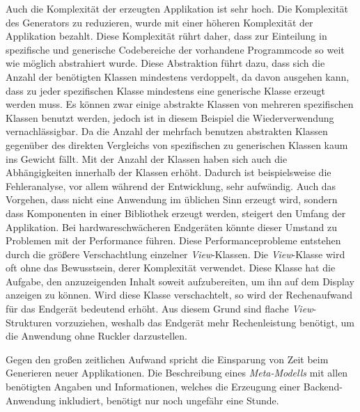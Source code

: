 Auch die Komplexität der erzeugten Applikation ist sehr hoch. Die Komplexität des Generators zu reduzieren, wurde mit einer höheren Komplexität der Applikation bezahlt. Diese Komplexität rührt daher, dass zur Einteilung in spezifische und generische Codebereiche der vorhandene Programmcode so weit wie möglich abstrahiert wurde. Diese Abstraktion führt dazu, dass sich die Anzahl der benötigten Klassen mindestens verdoppelt, da davon ausgehen kann, dass zu jeder spezifischen Klasse mindestens eine generische Klasse erzeugt werden muss. Es können zwar einige abstrakte Klassen von mehreren spezifischen Klassen benutzt werden, jedoch ist in diesem Beispiel die Wiederverwendung vernachlässigbar. Da die Anzahl der mehrfach benutzen abstrakten Klassen gegenüber des direkten Vergleichs von spezifischen zu generischen Klassen kaum ins Gewicht fällt. Mit der Anzahl der Klassen haben sich auch die Abhängigkeiten innerhalb der Klassen erhöht. Dadurch ist beispielsweise die Fehleranalyse, vor allem während der Entwicklung, sehr aufwändig. Auch das Vorgehen, dass nicht eine Anwendung im üblichen Sinn erzeugt wird, sondern dass Komponenten in einer Bibliothek erzeugt werden, steigert den Umfang der Applikation. Bei hardwareschwächeren Endgeräten könnte dieser Umstand zu Problemen mit der Performance führen. Diese Performanceprobleme entstehen durch die größere Verschachtlung einzelner \textit{View}-Klassen. Die \textit{View}-Klasse wird oft ohne das Bewusstsein, derer Komplexität verwendet. Diese Klasse hat die Aufgabe, den anzuzeigenden Inhalt soweit aufzubereiten, um ihn auf dem Display anzeigen zu können. Wird diese Klasse verschachtelt, so wird der Rechenaufwand für das Endgerät bedeutend erhöht. Aus diesem Grund sind flache \textit{View}-Strukturen vorzuziehen, weshalb das Endgerät mehr Rechenleistung benötigt, um die Anwendung ohne Ruckler darzustellen.

Gegen den großen zeitlichen Aufwand spricht die Einsparung von Zeit beim Generieren neuer Applikationen. Die Beschreibung eines \textit{Meta-Modells} mit allen benötigten Angaben und Informationen, welches die Erzeugung einer Backend-Anwendung inkludiert, benötigt nur noch ungefähr eine Stunde. 